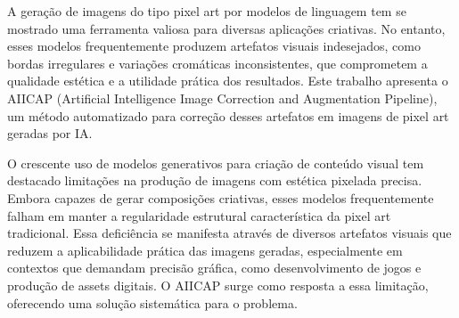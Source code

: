 \label{Cap:Introducao}

A geração de imagens do tipo pixel art por modelos de linguagem tem se mostrado uma ferramenta valiosa para diversas aplicações criativas. No entanto, esses modelos frequentemente produzem artefatos visuais indesejados, como bordas irregulares e variações cromáticas inconsistentes, que comprometem a qualidade estética e a utilidade prática dos resultados. Este trabalho apresenta o AIICAP (Artificial Intelligence Image Correction and Augmentation Pipeline), um método automatizado para correção desses artefatos em imagens de pixel art geradas por IA.


O crescente uso de modelos generativos para criação de conteúdo visual tem destacado limitações na produção de imagens com estética pixelada precisa. Embora capazes de gerar composições criativas, esses modelos frequentemente falham em manter a regularidade estrutural característica da pixel art tradicional. Essa deficiência se manifesta através de diversos artefatos visuais que reduzem a aplicabilidade prática das imagens geradas, especialmente em contextos que demandam precisão gráfica, como desenvolvimento de jogos e produção de assets digitais. O AIICAP surge como resposta a essa limitação, oferecendo uma solução sistemática para o problema.